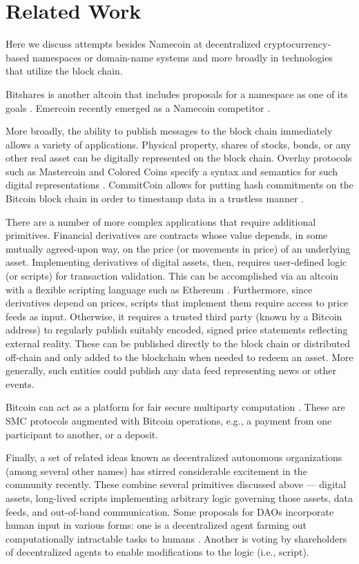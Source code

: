 \section{Related Work}
\label{sec:related}

Here we discuss attempts besides Namecoin at decentralized cryptocurrency-based namespaces or domain-name systems and more broadly in technologies that utilize the block chain.

Bitshares is another altcoin that includes proposals for a namespace as one of its goals \cite{bitsharesdns}. Emercoin recently emerged as a Namecoin competitor \cite{emercoin}. 

More broadly, the ability to publish messages to the block chain immediately allows a variety of applications. Physical property, shares of stocks, bonds, or any other real asset can be digitally represented on the block chain. Overlay protocols such as Mastercoin and Colored Coins specify a syntax and semantics for such digital representations \cite{mastercoinspec, rosenfeld2012overview}. CommitCoin allows for putting hash commitments on the Bitcoin block chain in order to timestamp data in a trustless manner \cite{clark2012commitcoin}.

There are a number of more complex applications that require additional primitives. Financial derivatives are contracts whose value depends, in some mutually agreed-upon way, on the price (or movements in price) of an underlying asset. Implementing derivatives of digital assets, then, requires user-defined logic (or scripts) for transaction validation. This can be accomplished via an altcoin with a flexible scripting language such as Ethereum \cite{ethereumwhitepaper}. Furthermore, since derivatives depend on prices, scripts that implement them require access to price feeds as input. Otherwise, it requires a trusted third party (known by a Bitcoin address) to regularly publish suitably encoded, signed price statements reflecting external reality. These can be published directly to the block chain or distributed off-chain and only added to the blockchain when needed to redeem an asset. More generally, such entities could publish any data feed representing news or other events.

Bitcoin can act as a platform for fair secure multiparty computation \cite{andrychowicz2014secure, bentov2014use, kumaresan2014use}. These are SMC protocols augmented with Bitcoin operations, e.g., a payment from one participant to another, or a deposit.

Finally, a set of related ideas known as decentralized autonomous organizations (among several other names) has stirred considerable excitement in the community recently. These combine several primitives discussed above --- digital assets, long-lived scripts implementing arbitrary logic governing those assets, data feeds, and out-of-band communication. Some proposals for DAOs incorporate human input in various forms: one is a decentralized agent farming out computationally intractable tasks to humans \cite{buterindao}. Another is voting by shareholders of decentralized agents to enable modifications to the logic (i.e., script). 

